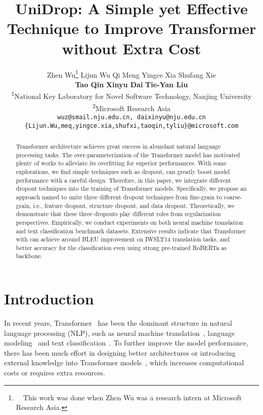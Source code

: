 \documentclass[11pt]{article}
\title{UniDrop: A Simple yet Effective Technique to Improve Transformer without Extra Cost}
\author{
	Zhen Wu\textsuperscript{\normalfont 1}\thanks{~~This work was done when Zhen Wu was a research intern at Microsoft Research Asia.} \quad
	Lijun Wu\textsuperscript{\normalfont 2} \quad
	Qi Meng\textsuperscript{\normalfont 2} \quad
	Yingce Xia\textsuperscript{\normalfont 2} \quad
	Shufang Xie\textsuperscript{\normalfont 2} \\
	{\bf Tao Qin}\textsuperscript{\normalfont 2} \quad
	{\bf Xinyu Dai}\textsuperscript{\normalfont 1} \quad
	{\bf Tie-Yan Liu}\textsuperscript{\normalfont 2} \quad
	\\ 
	\textsuperscript{1}National Key Laboratory for Novel Software Technology, Nanjing University \\
	\textsuperscript{2}Microsoft Research Asia \\
	\texttt{wuz@smail.nju.edu.cn, daixinyu@nju.edu.cn} \\
	\texttt{\{Lijun.Wu,meq,yingce.xia,shufxi,taoqin,tyliu\}@microsoft.com} \\
}
\begin{document}
\maketitle
\begin{abstract}
Transformer architecture achieves great success in abundant natural language processing tasks.
The over-parameterization of the Transformer model has motivated plenty of works to alleviate its overfitting for superior performances. With some explorations, we find simple techniques such as dropout, can greatly boost model performance with a careful design. Therefore, in this paper, we integrate different dropout techniques into the training of Transformer models. Specifically, we propose an approach named  to unite three different dropout techniques from fine-grain to coarse-grain, i.e., feature dropout, structure dropout, and data dropout. Theoretically, we demonstrate that these three dropouts play different roles from regularization perspectives. Empirically, we conduct experiments on both neural machine translation and text classification benchmark datasets. Extensive results indicate that Transformer with  can achieve around  BLEU improvement on IWSLT14 translation tasks, and better accuracy for the classification even using strong pre-trained RoBERTa as backbone.
\end{abstract}

\section{Introduction}
In recent years, Transformer~\cite{vaswani2017attention} has been the dominant structure in natural language processing (NLP), such as neural machine translation~\cite{vaswani2017attention}, language modeling~\cite{dai2019transformer} and text classification~\cite{devlin2019bert,liu2019roberta}. 
To further improve the model performance, there has been much effort in designing better architectures or introducing external knowledge into Transformer models~\cite{wu2018pay,lu2019understanding,Kitaev2020Reformer,ahmed2017weighted,hashemi2020guided}, which increases computational costs or requires extra resources.
\end{document}
